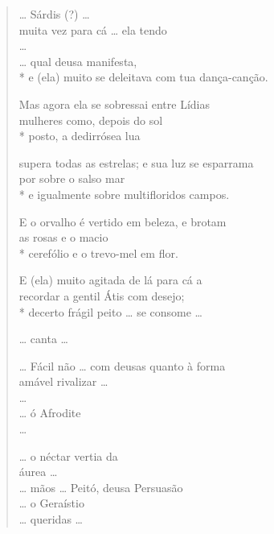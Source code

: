 \begin{verse}
\ldots{} Sárdis (?) \ldots{}\\
muita vez para cá \ldots{} ela tendo\\
\ldots{}\\
\ldots{} qual deusa manifesta,\\*
e (ela) muito se deleitava com tua dança-canção.

Mas agora ela se sobressai entre Lídias\\
mulheres como, depois do sol\\*
posto, a dedirrósea lua

supera todas as estrelas; e sua luz se esparrama\\
por sobre o salso mar \\*
e igualmente sobre multifloridos campos.

E o orvalho é vertido em beleza, e brotam\\
as rosas e o macio \\*
cerefólio e o trevo-mel em flor.

E (ela) muito agitada de lá para cá a \\
recordar a gentil Átis com desejo;\\*
decerto frágil peito \ldots{} se consome \ldots{}

\ldots{} canta \ldots{}

\ldots{} Fácil não \ldots{} com deusas quanto à forma\\
amável rivalizar \ldots{}\\
\ldots{}\\
\ldots{} ó Afrodite\\
\ldots{}

\ldots{} o néctar vertia da\\
áurea \ldots{}\\
\ldots{} mãos \ldots{} Peitó, deusa Persuasão\\
\ldots{} o Geraístio\\
\ldots{} queridas \ldots{}
\end{verse}

